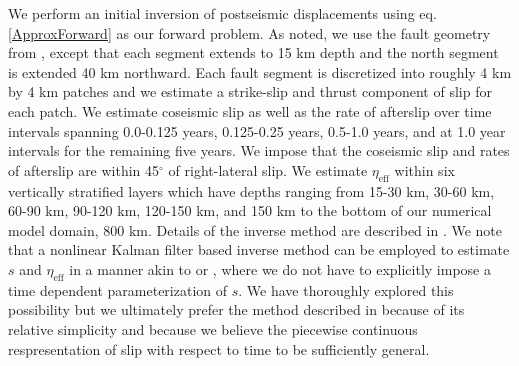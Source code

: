 \documentclass[1p]{elsarticle}
\begin{document}
We perform an initial inversion of postseismic displacements using eq. \ref{ApproxForward} as our forward problem. As noted, we use the fault geometry from \citet{Wei2011}, except that each segment extends to 15 km depth and the north segment is extended 40 km northward.  Each fault segment is discretized into roughly 4 km by 4 km patches and we estimate a strike-slip and thrust component of slip for each patch. We estimate coseismic slip as well as the rate of afterslip over time intervals spanning 0.0-0.125 years, 0.125-0.25 years, 0.5-1.0 years, and at 1.0 year intervals for the remaining five years.  We impose that the coseismic slip and rates of afterslip are within 45$^\circ$ of right-lateral slip.  We estimate $\eta_{\mathrm{eff}}$ within six vertically stratified layers which have depths ranging from 15-30 km, 30-60 km, 60-90 km, 90-120 km, 120-150 km, and 150 km to the bottom of our numerical model domain, 800 km. Details of the inverse method are described in \citet{Hines2015}.  We note that a nonlinear Kalman filter based inverse method can be employed to estimate $s$ and $\eta_{\mathrm{eff}}$ in a manner akin to \citet{Segall1997} or \citet{McGuire2003}, where we do not have to explicitly impose a time dependent parameterization of $s$. We have thoroughly explored this possibility but we ultimately prefer the method described in \citet{Hines2015} because of its relative simplicity and because we believe the piecewise continuous respresentation of slip with respect to time to be sufficiently general.
\end{document}
